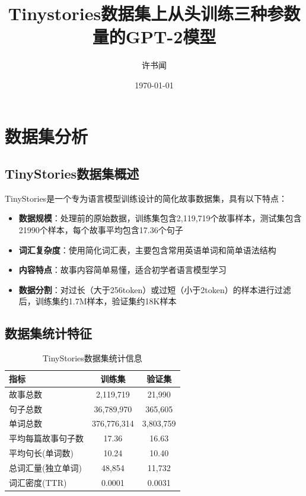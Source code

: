 \documentclass{article}
\begin{document}
\title{\Large{Tinystories数据集上从头训练三种参数量的GPT-2模型}}
\author{许书闻}
\date{\today}

\maketitle

\tableofcontents

\newpage
\section{数据集分析}

\subsection{TinyStories数据集概述}
TinyStories是一个专为语言模型训练设计的简化故事数据集，具有以下特点：

\begin{itemize}
    \item \textbf{数据规模}：处理前的原始数据，训练集包含2,119,719个故事样本，测试集包含21990个样本，每个故事平均包含17.36个句子
    \item \textbf{词汇复杂度}：使用简化词汇表，主要包含常用英语单词和简单语法结构
    \item \textbf{内容特点}：故事内容简单易懂，适合初学者语言模型学习
    \item \textbf{数据分割}：对过长（大于256token）或过短（小于2token）的样本进行过滤后，训练集约1.7M样本，验证集约18K样本
\end{itemize}

\subsection{数据集统计特征}
\begin{table}[h]
\centering
\caption{TinyStories数据集统计信息}
\begin{tabular}{lcc}
\toprule
\textbf{指标} & \textbf{训练集} & \textbf{验证集} \\
\midrule
故事总数 & 2,119,719 & 21,990 \\
句子总数 & 36,789,970 & 365,605 \\
单词总数 & 376,776,314 & 3,803,759 \\
平均每篇故事句子数 & 17.36 & 16.63 \\
平均句长(单词数) & 10.24 & 10.40 \\
总词汇量(独立单词) & 48,854 & 11,732 \\
词汇密度(TTR) & 0.0001 & 0.0031 \\
\bottomrule
\end{tabular}
\end{table}
\end{document}
